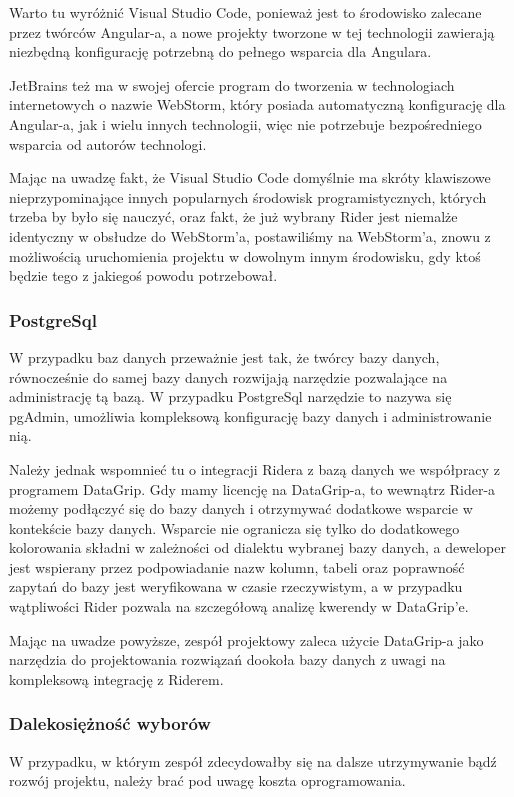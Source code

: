 Warto tu wyróżnić Visual Studio Code, ponieważ jest to środowisko zalecane przez twórców Angular-a, a nowe projekty tworzone w tej technologii zawierają niezbędną konfigurację potrzebną do pełnego wsparcia dla Angulara.

JetBrains też ma w swojej ofercie program do tworzenia w technologiach internetowych o nazwie WebStorm, który posiada automatyczną konfigurację dla Angular-a, jak i wielu innych technologii, więc nie potrzebuje bezpośredniego wsparcia od autorów technologi.

Mając na uwadzę fakt, że Visual Studio Code domyślnie ma skróty klawiszowe nieprzypominające innych popularnych środowisk programistycznych, których trzeba by było się nauczyć, oraz fakt, że już wybrany Rider jest niemalże identyczny w obsłudze do WebStorm'a, postawiliśmy na WebStorm'a, znowu z możliwością uruchomienia projektu w dowolnym innym środowisku, gdy ktoś będzie tego z jakiegoś powodu potrzebował.

\subsubsection{PostgreSql}
W przypadku baz danych przeważnie jest tak, że twórcy bazy danych, równocześnie do samej bazy danych rozwijają narzędzie pozwalające na administrację tą bazą.
W przypadku PostgreSql narzędzie to nazywa się pgAdmin, umożliwia kompleksową konfigurację bazy danych i administrowanie nią.

Należy jednak wspomnieć tu o integracji Ridera z bazą danych we współpracy z programem DataGrip.
Gdy mamy licencję na DataGrip-a, to wewnątrz Rider-a możemy podłączyć się do bazy danych i otrzymywać dodatkowe wsparcie w kontekście bazy danych.
Wsparcie nie ogranicza się tylko do dodatkowego kolorowania składni w zależności od dialektu wybranej bazy danych, a deweloper jest wspierany przez podpowiadanie nazw kolumn, tabeli oraz poprawność zapytań do bazy jest  weryfikowana w czasie rzeczywistym, a w przypadku wątpliwości Rider pozwala na szczegółową analizę kwerendy w DataGrip'e.

Mając na uwadze powyższe, zespół projektowy zaleca użycie DataGrip-a jako narzędzia do projektowania rozwiązań dookoła bazy danych z uwagi na kompleksową integrację z Riderem.

\subsubsection{Dalekosiężność wyborów}
W przypadku, w którym zespół zdecydowałby się na dalsze utrzymywanie bądź rozwój projektu, należy brać pod uwagę koszta oprogramowania.

